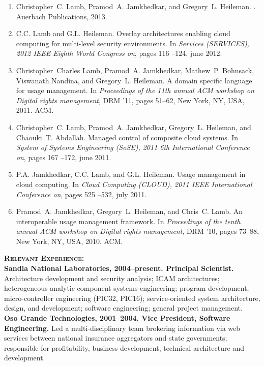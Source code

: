 \documentclass{sbir}
\begin{document}
{{{\begin{enumerate}
\item Christopher~C. Lamb, Pramod~A. Jamkhedkar, and Gregory~L. Heileman.
.
\newblock Auerbach Publications, 2013.

\item C.C. Lamb and G.L. Heileman.
\newblock Overlay architectures enabling cloud computing for multi-level
  security environments.
\newblock In {\em Services (SERVICES), 2012 IEEE Eighth World Congress on},
  pages 116 --124, june 2012.

\item Christopher~Charles Lamb, Pramod~A. Jamkhedkar, Mathew~P. Bohnsack, Viswanath
  Nandina, and Gregory~L. Heileman.
\newblock A domain specific language for usage management.
\newblock In {\em Proceedings of the 11th annual ACM workshop on Digital rights
  management}, DRM '11, pages 51--62, New York, NY, USA, 2011. ACM.

\item Christopher~C. Lamb, Pramod~A. Jamkhedkar, Gregory~L. Heileman, and Chaouki~T.
  Abdallah.
\newblock Managed control of composite cloud systems.
\newblock In {\em System of Systems Engineering (SoSE), 2011 6th International
  Conference on}, pages 167 --172, june 2011.

\item P.A. Jamkhedkar, C.C. Lamb, and G.L. Heileman.
\newblock Usage management in cloud computing.
\newblock In {\em Cloud Computing (CLOUD), 2011 IEEE International Conference
  on}, pages 525 --532, july 2011.

\item Pramod~A. Jamkhedkar, Gregory~L. Heileman, and Chris~C. Lamb.
\newblock An interoperable usage management framework.
\newblock In {\em Proceedings of the tenth annual ACM workshop on Digital
  rights management}, DRM '10, pages 73--88, New York, NY, USA, 2010. ACM.
\end{enumerate}

\vspace{-6pt}
\textbf{\textsc{Relevant Experience:}}~\\
{\bfseries Sandia National Laboratories, 2004--present. Principal Scientist.} Architecture development and security analysis; ICAM architectures; heterogeneous analytic component systems engineering; program development; micro-controller engineering (PIC32, PIC16); service-oriented system architecture, design, and development; software engineering; general project management.~\\
{\bfseries Oso Grande Technologies, 2001--2004. Vice President, Software Engineering.} Led a multi-disciplinary team brokering information via web services between national insurance aggregators and state governments; responsible for profitability, business development, technical architecture and development.

}}}
\end{document}
